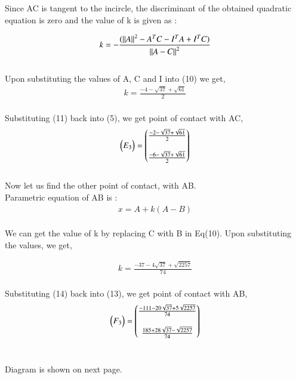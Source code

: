 \documentclass[journal,12pt,twocolumn]{IEEEtran}
\theoremstyle{remark}
\begin{document}
\begin{flushleft}
	Since AC is tangent to the incircle, the discriminant of the obtained quadratic equation is zero and the value of k is given as :

	\begin{align}
		k = -\frac{(\left\lVert A\right\rVert^2 - {A}^T C - {I}^T A + {I}^T C)}{\left\lVert A-C\right\rVert^2}
	\end{align}\\

	Upon substituting the values of A, C and I into (10) we get,  
	\begin{align}
		k = \frac{-4-\sqrt{37}+\sqrt{61}}{2}
	\end{align}\\

	Substituting (11) back into (5), we get point of contact with AC,
	\begin{align}
		\begin{pmatrix}{E}_3\end{pmatrix} = \begin{pmatrix}
			\frac{-2-\sqrt{37}+\sqrt{61}}{2}\\ \\
			\frac{-6-\sqrt{37}+\sqrt{61}}{2}
		\end{pmatrix}
	\end{align}\\

	\bigskip
	Now let us find the other point of contact, with AB.\\
	\bigskip
	Parametric equation of AB is : 
	\begin{align}
		x = A + k(A-B)
	\end{align}\\

	We can get the value of k by replacing C with B in Eq(10). Upon substituting the values, we get, 

	\begin{align}
		k = \frac{-37-4\sqrt{37}+\sqrt{2257}}{74}
	\end{align}\\

	Substituting (14) back into (13), we get point of contact with AB,
	\begin{align}
		\begin{pmatrix}{F}_3\end{pmatrix} = \begin{pmatrix}
			\frac{-111-20\sqrt{37}+5\sqrt{2257}}{74}\\ \\
			\frac{185+28\sqrt{37}-\sqrt{2257}}{74}
		\end{pmatrix}
	\end{align}\\
	
	\bigskip

	Diagram is shown on next page.

\end{flushleft}

\newpage
\end{document}
